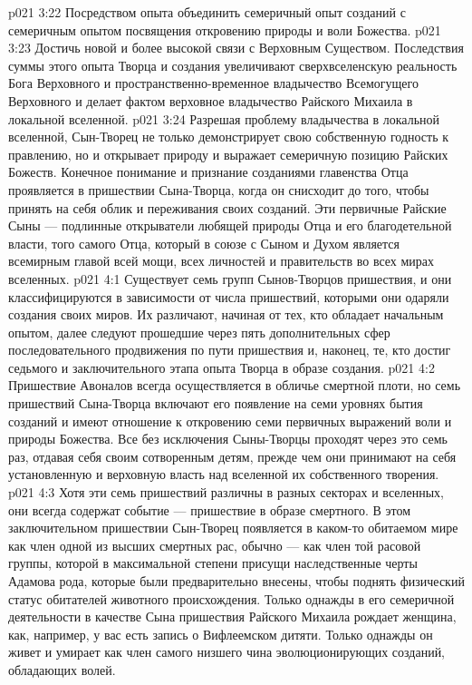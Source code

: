 \vs p021 3:22 \pc {}\bibnobreakspace Посредством опыта объединить семеричный опыт созданий с семеричным опытом посвящения откровению природы и воли Божества.
\vs p021 3:23 \pc {}\bibnobreakspace Достичь новой и более высокой связи с Верховным Существом. Последствия суммы этого опыта Творца и создания увеличивают сверхвселенскую реальность Бога Верховного и пространственно\hyp{}временное владычество Всемогущего Верховного и делает фактом верховное владычество Райского Михаила в локальной вселенной.
\vs p021 3:24 \pc Разрешая проблему владычества в локальной вселенной, Сын\hyp{}Творец не только демонстрирует свою собственную годность к правлению, но и открывает природу и выражает семеричную позицию Райских Божеств. Конечное понимание и признание созданиями главенства Отца проявляется в пришествии Сына\hyp{}Творца, когда он снисходит до того, чтобы принять на себя облик и переживания своих созданий. Эти первичные Райские Сыны --- подлинные открыватели любящей природы Отца и его благодетельной власти, того самого Отца, который в союзе с Сыном и Духом является всемирным главой всей мощи, всех личностей и правительств во всех мирах вселенных.
\vs p021 4:1 Существует семь групп Сынов\hyp{}Творцов пришествия, и они классифицируются в зависимости от числа пришествий, которыми они одаряли создания своих миров. Их различают, начиная от тех, кто обладает начальным опытом, далее следуют прошедшие через пять дополнительных сфер последовательного продвижения по пути пришествия и, наконец, те, кто достиг седьмого и заключительного этапа опыта Творца в образе создания.
\vs p021 4:2 Пришествие Авоналов всегда осуществляется в обличье смертной плоти, но семь пришествий Сына\hyp{}Творца включают его появление на семи уровнях бытия созданий и имеют отношение к откровению семи первичных выражений воли и природы Божества. Все без исключения Сыны\hyp{}Творцы проходят через это семь раз, отдавая себя своим сотворенным детям, прежде чем они принимают на себя установленную и верховную власть над вселенной их собственного творения.
\vs p021 4:3 Хотя эти семь пришествий различны в разных секторах и вселенных, они всегда содержат событие --- пришествие в образе смертного. В этом заключительном пришествии Сын\hyp{}Творец появляется в каком\hyp{}то обитаемом мире как член одной из высших смертных рас, обычно --- как член той расовой группы, которой в максимальной степени присущи наследственные черты Адамова рода, которые были предварительно внесены, чтобы поднять физический статус обитателей животного происхождения. Только однажды в его семеричной деятельности в качестве Сына пришествия Райского Михаила рождает женщина, как, например, у вас есть запись о Вифлеемском дитяти. Только однажды он живет и умирает как член самого низшего чина эволюционирующих созданий, обладающих волей.
